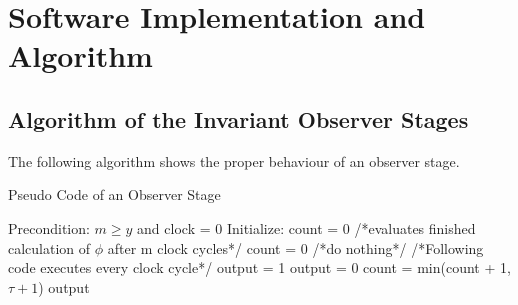 
\chapter{Software Implementation and Algorithm}
\label{chapter:2}


\section{Algorithm of the Invariant Observer Stages}
\label{chapter:sub:1}
The following algorithm shows the proper behaviour of an observer stage.\newline

\begin{algorithm}
\caption{Pseudo Code of an Observer Stage}
\label{alg:observerstage}
\begin{algorithmic}[1]
\REQUIRE Precondition: $m \ge y$ and clock = 0
\STATE Initialize: count = 0
 \STATE  /*evaluates finished calculation of $\phi$ after m clock cycles*/
 \STATE  count = 0 
 \ELSE
  \STATE /*do nothing*/ 
 \ENDIF
\ENDIF 
\STATE /*Following code executes every clock cycle*/
 \STATE output = 1
\ELSE
 \STATE output = 0
\ENDIF
\STATE count = min(count + 1,$\tau + 1$)
\RETURN output
\end{algorithmic}
\end{algorithm}

